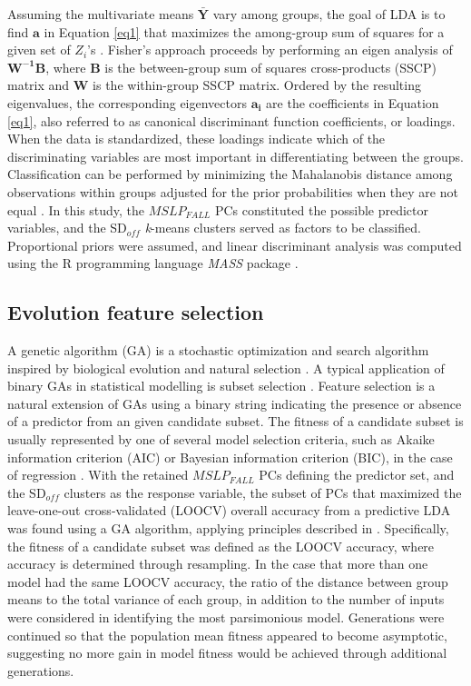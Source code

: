 \documentclass{tATO2e}
\newcommand{\sdoff}{SD$_{off}$}
\begin{document}
Assuming the multivariate means $\mathbf{\bar{Y}}$ vary among groups, the goal of LDA is to find $\mathbf{a}$ in Equation \ref{eq1} that maximizes the among-group sum of squares for a given set of $Z_{i}$'s \citep{Gotelli2013}. Fisher’s approach proceeds by performing an eigen analysis of $\mathbf{W^{-1}B}$, where $\mathbf{B}$ is the between-group sum of squares cross-products (SSCP) matrix and $\mathbf{W}$ is the within-group SSCP matrix. Ordered by the resulting eigenvalues, the corresponding eigenvectors $\bm{a_{i}}$ are the coefficients in Equation \ref{eq1}, also referred to as canonical discriminant function coefficients, or loadings. When the data is standardized, these loadings indicate which of the discriminating variables are most important in differentiating between the groups. Classification can be performed by minimizing the Mahalanobis distance among observations within groups adjusted for the prior probabilities when they are not equal \citep{Venables2002}. In this study, the $MSLP_{FALL}$ PCs constituted the possible predictor variables, and the \sdoff{} \textit{k}-means clusters served as factors to be classified. Proportional priors were assumed, and linear discriminant analysis was computed using the R programming language \textit{MASS} package \citep{Venables2002}.


\subsection{Evolution feature selection}
A genetic algorithm (GA) is a stochastic optimization and search algorithm inspired by biological evolution and natural selection \citep{Mitchell1998}. A typical application of binary GAs in statistical modelling is subset selection \citep{Scrucca2013}. Feature selection is a natural extension of GAs using a binary string indicating the presence or absence of a predictor from an given candidate subset. The fitness of a candidate subset is usually represented by one of several model selection criteria, such as Akaike information criterion (AIC) or Bayesian information criterion (BIC), in the case of regression \citep{Bozdogan2003}. With the retained $MSLP_{FALL}$ PCs defining the predictor set, and the \sdoff{} clusters as the response variable, the subset of PCs that maximized the leave-one-out cross-validated (LOOCV) overall accuracy from a predictive LDA was found using a GA algorithm, applying principles described in \cite{Scrucca2013}. Specifically, the fitness of a candidate subset was defined as the LOOCV accuracy, where accuracy is determined through resampling. In the case that more than one model had the same LOOCV accuracy, the ratio of the distance between group means to the total variance of each group, in addition to the number of inputs were considered in identifying the most parsimonious model. Generations were continued so that the population mean fitness appeared to become asymptotic, suggesting no more gain in model fitness would be achieved through additional generations.  
\end{document}
